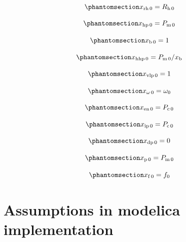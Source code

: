 \documentclass[
  a4paper,
  DIV=11,
  numbers=noendperiod]{scrartcl}
\begin{document}
\begin{equation}\phantomsection\label{eq-initXrh}{
x_\mathrm{rh\,0} = R_\mathrm{h\,0}
}\end{equation}

\begin{equation}\phantomsection\label{eq-initXhp}{
x_\mathrm{hp\,0} = P_\mathrm{m\,0}
}\end{equation}

\begin{equation}\phantomsection\label{eq-initXb}{
x_\mathrm{b\,0} = 1
}\end{equation}

\begin{equation}\phantomsection\label{eq-initXhhp}{
x_\mathrm{hhp\,0} = P_\mathrm{m\,0}/x_\mathrm{b}
}\end{equation}

\begin{equation}\phantomsection\label{eq-initXvip}{
x_\mathrm{vlp\,0} = 1
}\end{equation}

\begin{equation}\phantomsection\label{eq-initXomega}{
x_\mathrm{\omega\,0} =  \omega_\mathrm{0}
}\end{equation}

\begin{equation}\phantomsection\label{eq-initXen}{
x_\mathrm{en\,0} = P_\mathrm{c\,0}
}\end{equation}

\begin{equation}\phantomsection\label{eq-initXip}{
x_\mathrm{ip\,0} = P_\mathrm{c\,0}
}\end{equation}

\begin{equation}\phantomsection\label{eq-initXdp}{
x_\mathrm{dp\,0} = 0
}\end{equation}

\begin{equation}\phantomsection\label{eq-initXp}{
x_\mathrm{p\,0} = P_\mathrm{m\,0}
}\end{equation}

\begin{equation}\phantomsection\label{eq-initXf}{
x_\mathrm{f\,0} = f_\mathrm{0}
}\end{equation}

\section{Assumptions in modelica
implementation}\label{assumptions-in-modelica-implementation}
\end{document}
